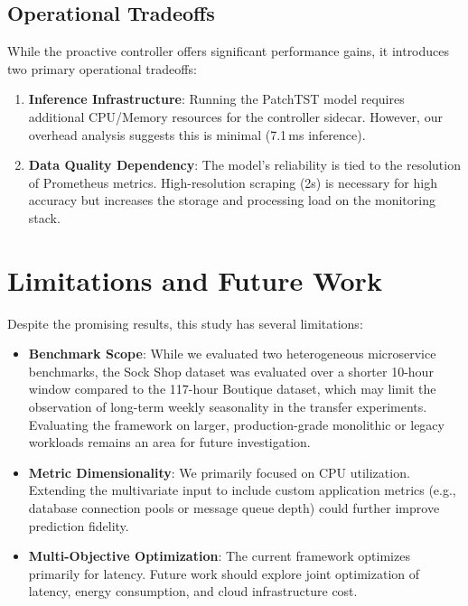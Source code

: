 \documentclass[conference]{IEEEtran}
\begin{document}
\subsection{Operational Tradeoffs}
While the proactive controller offers significant performance gains, it introduces two primary operational tradeoffs:
\begin{enumerate}
    \item \textbf{Inference Infrastructure}: Running the PatchTST model requires additional CPU/Memory resources for the controller sidecar. However, our overhead analysis suggests this is minimal (7.1\,ms inference).
    \item \textbf{Data Quality Dependency}: The model's reliability is tied to the resolution of Prometheus metrics. High-resolution scraping (2s) is necessary for high accuracy but increases the storage and processing load on the monitoring stack.
\end{enumerate}

\section{Limitations and Future Work}\label{sec:limitations}

Despite the promising results, this study has several limitations:
\begin{itemize}
    \item \textbf{Benchmark Scope}: While we evaluated two heterogeneous microservice benchmarks, the Sock Shop dataset was evaluated over a shorter 10-hour window compared to the 117-hour Boutique dataset, which may limit the observation of long-term weekly seasonality in the transfer experiments. Evaluating the framework on larger, production-grade monolithic or legacy workloads remains an area for future investigation.
    \item \textbf{Metric Dimensionality}: We primarily focused on CPU utilization. Extending the multivariate input to include custom application metrics (e.g., database connection pools or message queue depth) could further improve prediction fidelity.
    \item \textbf{Multi-Objective Optimization}: The current framework optimizes primarily for latency. Future work should explore joint optimization of latency, energy consumption, and cloud infrastructure cost.
\end{itemize}
\end{document}

